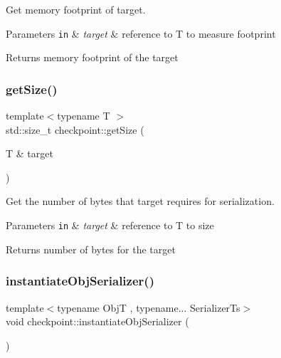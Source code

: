 Get memory footprint of {\ttfamily target}. 


\begin{DoxyParams}[1]{Parameters}
\mbox{\tt in}  & {\em target} & reference to {\ttfamily T} to measure footprint\\
\hline
\end{DoxyParams}
\begin{DoxyReturn}{Returns}
memory footprint of the {\ttfamily target} 
\end{DoxyReturn}
\mbox{\label{namespacecheckpoint_af0e68ef201b5e6831939bcd752e1b18b}} 
\subsubsection{\texorpdfstring{get\+Size()}{getSize()}}
{\footnotesize\ttfamily template$<$typename T $>$ \\
std\+::size\+\_\+t checkpoint\+::get\+Size (\begin{DoxyParamCaption}\item[{T \&}]{target }\end{DoxyParamCaption})}



Get the number of bytes that {\ttfamily target} requires for serialization. 


\begin{DoxyParams}[1]{Parameters}
\mbox{\tt in}  & {\em target} & reference to {\ttfamily T} to size\\
\hline
\end{DoxyParams}
\begin{DoxyReturn}{Returns}
number of bytes for the {\ttfamily target} 
\end{DoxyReturn}
\mbox{\label{namespacecheckpoint_a09875c2d3c012be868f3fd88b3ed55be}} 
\subsubsection{\texorpdfstring{instantiate\+Obj\+Serializer()}{instantiateObjSerializer()}}
{\footnotesize\ttfamily template$<$typename ObjT , typename... Serializer\+Ts$>$ \\
void checkpoint\+::instantiate\+Obj\+Serializer (\begin{DoxyParamCaption}{ }\end{DoxyParamCaption})\hspace{0.3cm}{\ttfamily [inline]}}

